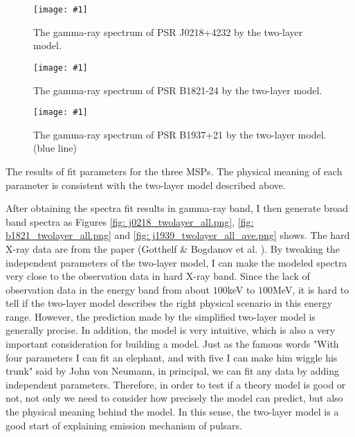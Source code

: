 \documentclass[12pt]{report}
\newcommand{\mycaption}[1]{\protect \caption{#1}}
\newcommand{\singleFig}[3]{
  \begin{figure}[!htp]
    \centering
    \texttt{[image: \#1]}
    \caption{#3}
    \label{fig: #1}
  \end{figure}
}
\newcommand{\change}[1]{
  $<$\colorbox{red}{\textbf{change}}$>$#1$<$\colorbox{red}{\textbf{/change}}$>$
}
\newcommand{\mayChange}[1]{
  $<$\colorbox{red}{\textbf{mayChange}}$>$#1$<$\colorbox{red}{\textbf{/mayChange}}$>$
}
\begin{document}
    \singleFig{j0218_twolayer_cur.png}{0.37}{The gamma-ray spectrum of PSR J0218+4232 by 
      the two-layer model.}
    \singleFig{b1821_twolayer_cur.png}{0.37}{The gamma-ray spectrum of PSR B1821-24 by 
      the two-layer model.}
    \singleFig{j1939_twolayer_cur.png}{0.38}{The gamma-ray spectrum of PSR B1937+21 by 
      the two-layer model. (blue line)}

        
    \begin{table}[!htp]
      \centering
      \mycaption{The results of fit parameters for the three MSPs. The physical 
        meaning of each parameter is consistent with the two-layer model described above.}
      \label{table: twolayer_fit_parameter}
    \end{table}
    \vspace{0.5cm}
          
    After obtaining the spectra fit results in gamma-ray band, I then generate broad band 
    spectra as Figures \ref{fig: j0218_twolayer_all.png}, \ref{fig: b1821_twolayer_all.png}
    and \ref{fig: j1939_twolayer_all_ave.png} shows. 
    The hard X-ray data are from the paper (Gotthelf \& Bogdanov et al. \cite{0004-637X-845-2-159}).
    By tweaking the independent parameters of the two-layer model, I can make the modeled spectra 
    very close to the observation data in hard X-ray band. Since the lack of observation data in 
    the energy band from about $100$keV to $100$MeV, it is hard to tell if the two-layer model 
    describes the right physical scenario in this energy range. However, the prediction made 
    by the simplified two-layer model is generally precise. In addition, the model is very 
    intuitive, which is also a very important consideration for building a model. Just as 
    the famous words "With four parameters I can fit an elephant, and with five I 
    can make him wiggle his trunk" 
    said by John von Neumann, in principal, we can fit any data by adding independent 
    parameters. Therefore, in order to test if a theory model is good or not, not only we 
    need to consider how precisely the model can predict, but also the physical meaning 
    behind the model. In this sense, the two-layer model is a good start of explaining 
    emission mechanism of pulsars. 
      
\end{document}
